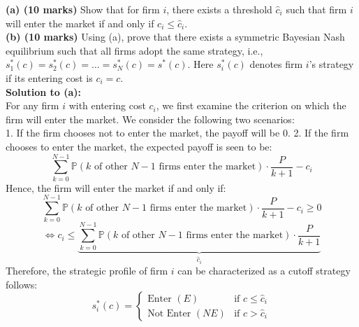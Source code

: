 \documentclass[twoside]{article}
\theoremstyle{definitionstyle}
\begin{document}
\noindent \textbf{(a) (10 marks)} Show that for firm $i$, there exists a threshold $\hat{c}_i$ such that firm $i$ will enter the market if and only if $c_i \leq \hat{c}_i$.\\
\noindent \textbf{(b) (10 marks)} Using (a), prove that there exists a symmetric Bayesian Nash equilibrium such that all firms adopt the same strategy, i.e., $s_1^*(c) = s_2^*(c) = \dots = s_N^*(c) = s^*(c)$. Here $s_i^*(c)$ denotes firm $i$'s strategy if its entering cost is $c_i = c$.\\
\noindent \textbf{Solution to (a):}\\
\noindent For any firm $i$ with entering cost $c_i$, we first examine the criterion on which the firm will enter the market. We consider the following two scenarios:\\
1. If the firm chooses not to enter the market, the payoff will be $0$.
2. If the firm chooses to enter the market, the expected payoff is seen to be:
    \[
    \sum_{k=0}^{N-1} \mathbb{P}\left(\text{$k$ of other $N-1$ firms enter the market}\right) \cdot \frac{P}{k+1} - c_i
    \]
Hence, the firm will enter the market if and only if:
\[
\sum_{k=0}^{N-1} \mathbb{P}\left(\text{$k$ of other $N-1$ firms enter the market}\right) \cdot \frac{P}{k+1} - c_i \geq 0
\]
\[
\iff c_i \leq \underbrace{\sum_{k=0}^{N-1} \mathbb{P}\left(\text{$k$ of other $N-1$ firms enter the market}\right) \cdot \frac{P}{k+1}}_{\hat{c}_i}
\]
Therefore, the strategic profile of firm $i$ can be characterized as a cutoff strategy follows:
\[
s_i^*(c) = 
\begin{cases} 
\text{Enter } (E) & \text{if } c \leq \hat{c}_i \\ 
\text{Not Enter } (NE) & \text{if } c > \hat{c}_i 
\end{cases}
\]
\end{document}
